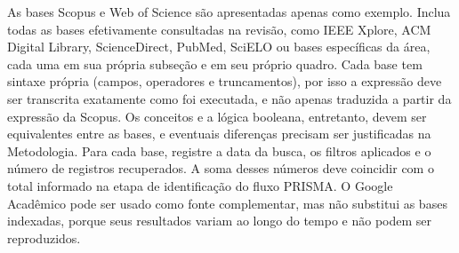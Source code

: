 \begin{orientacao}
  As bases Scopus e Web of Science são apresentadas apenas como exemplo. Inclua todas as bases efetivamente consultadas na revisão, como IEEE Xplore, ACM Digital Library, ScienceDirect, PubMed, SciELO ou bases específicas da área, cada uma em sua própria subseção e em seu próprio quadro. Cada base tem sintaxe própria (campos, operadores e truncamentos), por isso a expressão deve ser transcrita exatamente como foi executada, e não apenas traduzida a partir da expressão da Scopus. Os conceitos e a lógica booleana, entretanto, devem ser equivalentes entre as bases, e eventuais diferenças precisam ser justificadas na Metodologia. Para cada base, registre a data da busca, os filtros aplicados e o número de registros recuperados. A soma desses números deve coincidir com o total informado na etapa de identificação do fluxo PRISMA. O Google Acadêmico pode ser usado como fonte complementar, mas não substitui as bases indexadas, porque seus resultados variam ao longo do tempo e não podem ser reproduzidos.
\end{orientacao}

%
